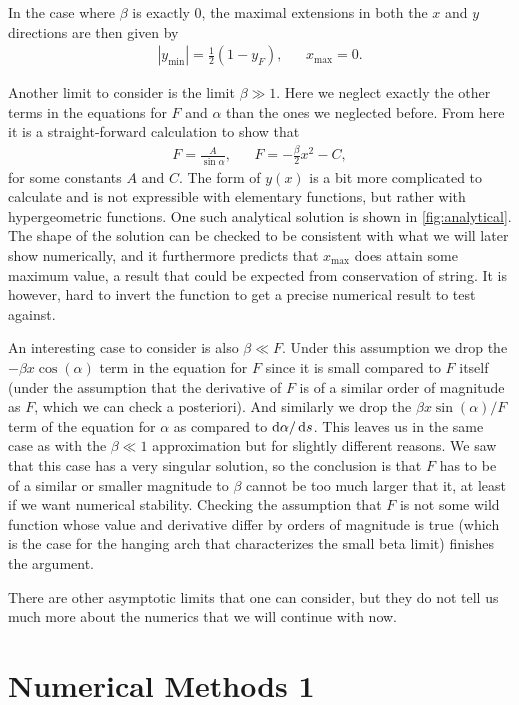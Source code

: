 \documentclass[10pt,a4paper,twocolumn]{article}
\begin{document}
In the case where $\beta$ is exactly $0$, the maximal extensions in both the $x$ and $y$ directions are then given by
%
\begin{align}
    &|y_{\mathrm{min}}| = \frac{1}{2} (1 - y_F),& &x_{\mathrm{max}} = 0.&
\end{align}

Another limit to consider is the limit $\beta \gg 1$. Here we neglect exactly the other terms in the equations for $F$ and $\alpha$ than the ones we neglected before. From here it is a straight-forward calculation to show that
%
\begin{align}
    &F = \frac{A}{\sin \alpha},& &F = -\frac{\beta}{2}x^2 - C,&
\end{align}
%
for some constants $A$ and $C$. The form of $y(x)$ is a bit more complicated to calculate and is not expressible with elementary functions, but rather with hypergeometric functions. One such analytical solution is shown in \cref{fig:analytical}. The shape of the solution can be checked to be consistent with what we will later show numerically, and it furthermore predicts that $x_{\mathrm{max}}$ does attain some maximum value, a result that could be expected from conservation of string. It is however, hard to invert the function to get a precise numerical result to test against.

An interesting case to consider is also $\beta \ll F$. Under this assumption we drop the $- \beta x \cos (\alpha)$ term in the equation for $F$ since it is small compared to $F$ itself (under the assumption that the derivative of $F$ is of a similar order of magnitude as $F$, which we can check a posteriori). And similarly we drop the  $\beta x \sin (\alpha) / F$ term of the equation for $\alpha$ as compared to $\dif \alpha / \dif s$. This leaves us in the same case as with the $\beta \ll 1$ approximation but for slightly different reasons. We saw that this case has a very singular solution, so the conclusion is that $F$ has to be of a similar  or smaller magnitude to $\beta$ cannot be too much larger that it, at least if we want numerical stability. Checking the assumption that $F$ is not some wild function whose value and derivative differ by orders of magnitude is true (which is the case for the hanging arch that characterizes the small beta limit) finishes the argument. 

There are other asymptotic limits that one can consider, but they do not tell us much more about the numerics that we will continue with now.


\section{Numerical Methods 1}
\end{document}
